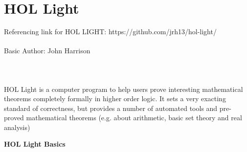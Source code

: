 \documentclass[15]{article}
\begin{document}
\section{HOL Light}
Referencing link for HOL LIGHT:   https://github.com/jrh13/hol-light/
\\
\\
Basic
Author: John Harrison 
\\
\\
\\
\\
HOL Light is a computer program to help users prove interesting mathematical theorems completely formally in higher order logic. It sets a very exacting standard of correctness, but provides a number of automated tools and pre-proved mathematical theorems (e.g. about arithmetic, basic set theory and real analysis)
\pagebreak

\textbf{HOL Light Basics}
\end{document}
